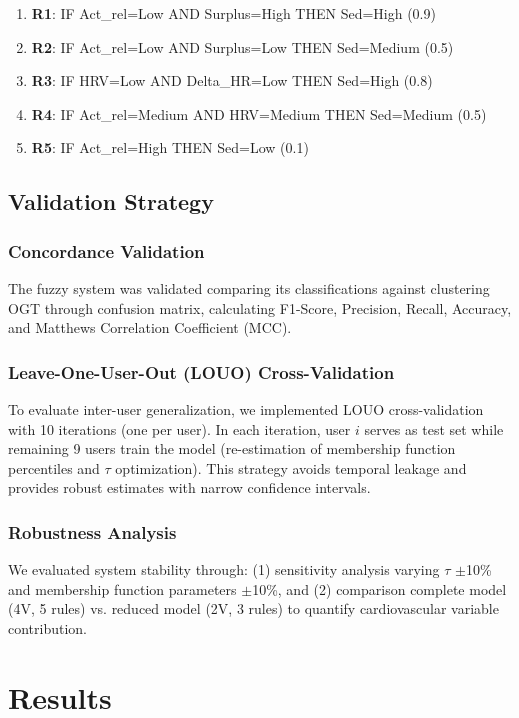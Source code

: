 \documentclass[journal,twoside,web]{ieeecolor}
\begin{document}
\begin{enumerate}
\item \textbf{R1}: IF Act\_rel=Low AND Surplus=High THEN Sed=High (0.9)
\item \textbf{R2}: IF Act\_rel=Low AND Surplus=Low THEN Sed=Medium (0.5)
\item \textbf{R3}: IF HRV=Low AND Delta\_HR=Low THEN Sed=High (0.8)
\item \textbf{R4}: IF Act\_rel=Medium AND HRV=Medium THEN Sed=Medium (0.5)
\item \textbf{R5}: IF Act\_rel=High THEN Sed=Low (0.1)
\end{enumerate}

\subsection{Validation Strategy}

\subsubsection{Concordance Validation}
The fuzzy system was validated comparing its classifications against clustering OGT through confusion matrix, calculating F1-Score, Precision, Recall, Accuracy, and Matthews Correlation Coefficient (MCC).

\subsubsection{Leave-One-User-Out (LOUO) Cross-Validation}
To evaluate inter-user generalization, we implemented LOUO cross-validation with 10 iterations (one per user). In each iteration, user $i$ serves as test set while remaining 9 users train the model (re-estimation of membership function percentiles and $\tau$ optimization). This strategy avoids temporal leakage and provides robust estimates with narrow confidence intervals.

\subsubsection{Robustness Analysis}
We evaluated system stability through: (1) sensitivity analysis varying $\tau$ $\pm$10\% and membership function parameters $\pm$10\%, and (2) comparison complete model (4V, 5 rules) vs. reduced model (2V, 3 rules) to quantify cardiovascular variable contribution.

\section{Results}
\end{document}
